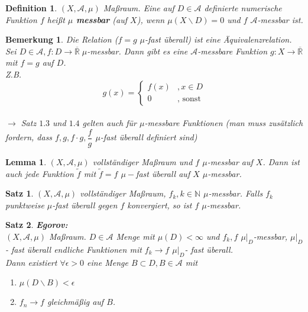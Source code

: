 \documentclass[11pt]{memoir}
\theoremstyle{changebreak}
\newtheorem{Definition}{Definition}[chapter]
\newtheorem{Bemerkung}{Bemerkung}[chapter]
\newtheorem{Lemma}{Lemma}[chapter]
\newtheorem{Satz}{Satz}[chapter]
\begin{document}
\begin{Definition}
$(X, \mathscr A, \mu)$ Maßraum. Eine auf $D \in \mathscr A$ definierte numerische Funktion $f$ heißt \textbf{$\mu$ messbar} (auf $X$), wenn $\mu(X \backslash D) = 0$ und $f$ $\mathscr A$-messbar ist.
\end{Definition}

\begin{Bemerkung}
Die Relation ($f = g$ $\mu$-fast überall) ist eine Äquivalenzrelation. \\
Sei $D \in \mathscr A, f: D \rightarrow \overline{\mathbb R} \; \mu$-messbar. Dann gibt es eine $\mathscr A$-messbare Funktion $g: X \rightarrow \overline{\mathbb R}$ mit $f = g$ auf $D$. \\
\emph{Z.B.} \\
\begin{equation}
	g(x) =
	\begin{cases}
		f(x) & , x \in D \\
		0 & \text{, sonst}
	\end{cases}
\end{equation} \\
$\rightarrow$ Satz $1.3$ und $1.4$ gelten auch für $\mu$-messbare Funktionen (man muss zusätzlich fordern, dass $f, g, f \cdotp g, \dfrac{f}{g}$ $ \mu$-fast überall definiert sind)
\end{Bemerkung}


\begin{Lemma}
$(X, \mathscr A, \mu)$ vollständiger Maßraum und $f$ $\mu$-messbar auf $X$. Dann ist auch jede Funktion $\tilde f$ mit $\tilde f = f$ $\mu-$fast überall auf $X$ $\mu$-messbar.
\end{Lemma}


\begin{Satz}
$(X, \mathscr A, \mu)$ vollständiger Maßraum, $f_k, k \in \mathbb N$ $\mu$-messbar. Falls $f_k$ punktweise $\mu$-fast überall gegen $f$ konvergiert, so ist $f$ $\mu$-messbar.
\end{Satz}

\begin{Satz}{\emph{\textbf{Egorov:}}} \\
$(X, \mathscr A, \mu)$ Maßraum. $D \in \mathscr A$ Menge mit $\mu(D) \less \infty$ und $f_k, f$ $ \mu|_D$-messbar, $\mu|_D$ - fast überall endliche Funktionen mit $f_k \rightarrow f$ $\mu|_D$- fast überall. \\
Dann existiert $\forall \epsilon > 0$ eine Menge $B \subset D, B \in \mathscr A$ mit 
\begin{enumerate}
	\item $\mu(D\backslash B) \less \epsilon$
	\item $f_n \rightarrow f$ gleichmäßig auf $B$.
\end{enumerate}
\end{Satz}
\end{document}

